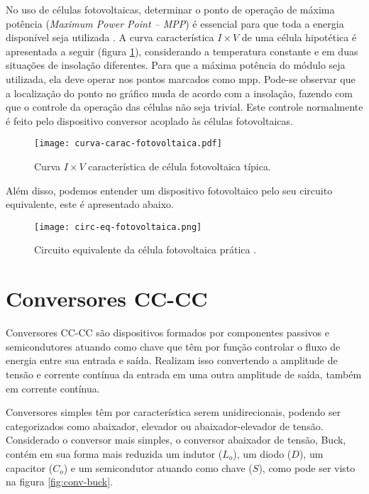    No uso de células fotovoltaicas, determinar o ponto de operação de máxima potência (\textit{Maximum Power Point – MPP}) é essencial para que toda a energia disponível seja utilizada \cite{Dem03}. A curva característica $I \times V$ de uma célula hipotética é apresentada a seguir (figura \ref{fig:curva-carac-fotovoltaica}), considerando a temperatura constante e em duas situações de insolação diferentes. Para que a máxima potência do módulo seja utilizada, ela deve operar nos pontos marcados como mpp. Pode-se observar que a localização do ponto no gráfico muda de acordo com a insolação, fazendo com que o controle da operação das células não seja trivial. Este controle normalmente é feito pelo dispositivo conversor acoplado às células fotovoltaicas.

   \begin{figure}[!htb]
      \centering
      \texttt{[image: curva-carac-fotovoltaica.pdf]}
      \caption{Curva $I \times V$ característica de célula fotovoltaica típica.}
   \label{fig:curva-carac-fotovoltaica}
   \end{figure}

   Além disso, podemos entender um dispositivo fotovoltaico pelo seu circuito equivalente, este é apresentado abaixo.

   \begin{figure}[!htb]
      \centering
      \texttt{[image: circ-eq-fotovoltaica.png]}
      \caption{Circuito equivalente da célula fotovoltaica prática \cite{Oli16}.}
      \label{fig:circ-eq-fotovoltaica}
   \end{figure}


\section{Conversores CC-CC}

   Conversores CC-CC são dispositivos formados por componentes passivos e semicondutores atuando como chave que têm por função controlar o fluxo de energia entre sua entrada e saída. Realizam isso convertendo a amplitude de tensão e corrente contínua da entrada em uma outra amplitude de saída, também em corrente contínua.

   Conversores simples têm por característica serem unidirecionais, podendo ser categorizados como abaixador, elevador ou abaixador-elevador de tensão. Considerado o conversor mais simples, o conversor abaixador de tensão, Buck, contém em sua forma mais reduzida um indutor ($L_o$), um diodo ($D$), um capacitor ($C_o$) e um semicondutor atuando como chave ($S$), como pode ser visto na figura \ref{fig:conv-buck}.

